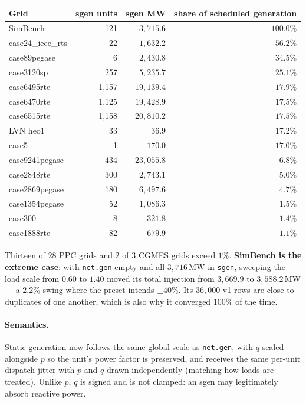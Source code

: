 \documentclass{article}
\newcommand{\dwarn}[1]{\textcolor{warn}{#1}}
\newcommand{\dbad}[1]{\textcolor{bad}{#1}}
\begin{document}
\begin{center}
\begin{tabular}{lrrr}
\toprule
\textbf{Grid} & \textbf{sgen units} & \textbf{sgen MW} & \textbf{share of scheduled generation} \\
\midrule
SimBench          & 121   & $3{,}715.6$  & \dbad{$100.0\%$} \\
case24\_ieee\_rts & 22    & $1{,}632.2$  & \dbad{$56.2\%$} \\
case89pegase      & 6     & $2{,}430.8$  & \dbad{$34.5\%$} \\
case3120sp        & 257   & $5{,}235.7$  & \dbad{$25.1\%$} \\
case6495rte       & 1{,}157 & $19{,}139.4$ & \dwarn{$17.9\%$} \\
case6470rte       & 1{,}125 & $19{,}428.9$ & \dwarn{$17.5\%$} \\
case6515rte       & 1{,}158 & $20{,}810.2$ & \dwarn{$17.5\%$} \\
LVN heo1          & 33    & $36.9$       & \dwarn{$17.2\%$} \\
case5             & 1     & $170.0$      & \dwarn{$17.0\%$} \\
case9241pegase    & 434   & $23{,}055.8$ & \dwarn{$6.8\%$} \\
case2848rte       & 300   & $2{,}743.1$  & $5.0\%$ \\
case2869pegase    & 180   & $6{,}497.6$  & $4.7\%$ \\
case1354pegase    & 52    & $1{,}086.3$  & $1.5\%$ \\
case300           & 8     & $321.8$      & $1.4\%$ \\
case1888rte       & 82    & $679.9$      & $1.1\%$ \\
\bottomrule
\end{tabular}
\end{center}

\noindent
Thirteen of 28 PPC grids and 2 of 3 CGMES grids exceed $1\%$.  \textbf{SimBench
is the extreme case}: with \texttt{net.gen} empty and all $3{,}716$\,MW in
\texttt{sgen}, sweeping the load scale from $0.60$ to $1.40$ moved its total
injection from $3{,}669.9$ to $3{,}588.2$\,MW --- a $2.2\%$ swing where the
preset intends $\pm40\%$.  Its $36{,}000$ v1 rows are close to duplicates of one
another, which is also why it converged $100\%$ of the time.

\paragraph{Semantics.}  Static generation now follows the same global scale as
\texttt{net.gen}, with $q$ scaled alongside $p$ so the unit's power factor is
preserved, and receives the same per-unit dispatch jitter with $p$ and $q$ drawn
independently (matching how loads are treated).  Unlike $p$, $q$ is signed and
is not clamped: an sgen may legitimately absorb reactive power.
\end{document}
